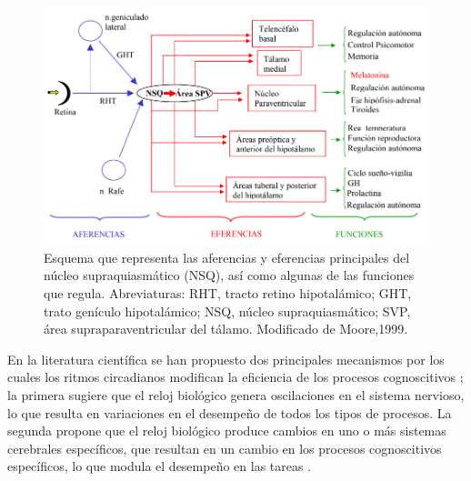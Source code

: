 \documentclass[12pt,letterpaper,final]{article}
\let\cite\cite %
\begin{document}
\begin{figure}[ht]
	\centering
	\includegraphics[scale=0.45]{Vias-NSQ.png}
\begin{footnotesize}	
	\caption{Esquema que representa las aferencias y eferencias principales del núcleo supraquiasmático
		(NSQ), así como algunas de las funciones que regula. Abreviaturas: RHT, tracto retino hipotalámico; GHT,
		trato genículo hipotalámico; NSQ, núcleo supraquiasmático; SVP, área supraparaventricular del tálamo.
		Modificado de Moore,1999.}
	\label{fig:EstructuraNSQ}
	\end{footnotesize}
\end{figure}



En la literatura científica se han propuesto dos principales mecanismos por los cuales los ritmos circadianos modifican la eficiencia de los procesos cognoscitivos  \cite{Valdez2014}; la primera sugiere que el reloj biológico genera oscilaciones en el sistema nervioso, lo que resulta en variaciones en el desempeño de todos los tipos de procesos. La segunda propone que el reloj biológico produce cambios en uno o más sistemas cerebrales específicos, que resultan en un cambio en los procesos cognoscitivos  específicos, lo que modula el desempeño en las tareas \cite{Valdez2014}.
\end{document}
